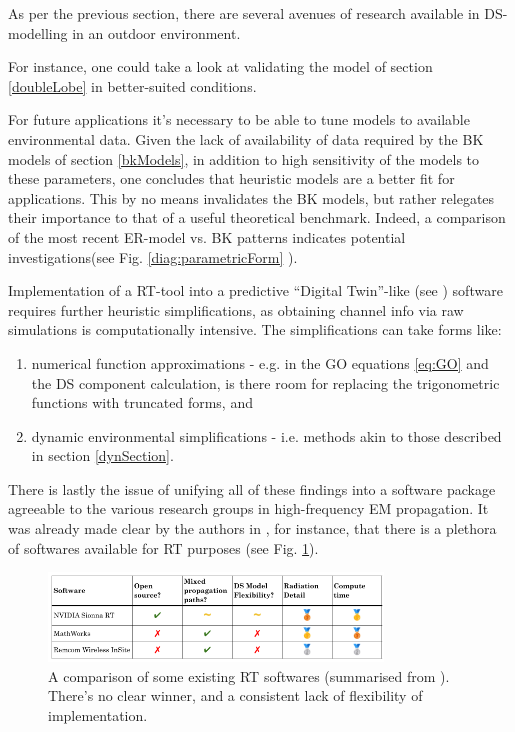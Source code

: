 \documentclass[lettersize,journal]{IEEEtran}
\begin{document}
As per the previous section, there are several avenues of research available in DS-modelling in an outdoor environment.

For instance, one could take a look at validating the model of section \ref{doubleLobe} in better-suited conditions.

For future applications it's necessary to be able to tune models to available environmental data. Given the lack of availability of data required by the BK models of section \ref{bkModels}, in addition to high sensitivity of the models to these parameters, one concludes that heuristic models are a better fit for applications. This by no means invalidates the BK models, but rather relegates their importance to that of a useful theoretical benchmark. Indeed, a comparison of the most recent ER-model vs. BK patterns indicates potential investigations(see Fig. \ref{diag:parametricForm} ).


Implementation of a RT-tool into a predictive ``Digital Twin''-like (see \cite{ref:RTComparison}) software requires further heuristic simplifications, as obtaining channel info via raw simulations is computationally intensive. The simplifications can take forms like:

\begin{enumerate}
	\item numerical function approximations - e.g. in the GO equations \eqref{eq:GO} and the DS component calculation, is there room for replacing the trigonometric functions with truncated forms, and
	\item dynamic environmental simplifications - i.e. methods akin to those described in section \ref{dynSection}.
\end{enumerate}

There is lastly the issue of unifying all of these findings into a software package agreeable to the various research groups in high-frequency EM propagation. It was already made clear by the authors in \cite{ref:RTComparison}, for instance, that there is a plethora of softwares available for RT purposes (see Fig. \ref{diag:RTSoftware}).

\begin{figure}[b]
\centering
\includegraphics[width=3.5in]{RTSoftware}
\captionsetup{singlelinecheck=off}
	\caption[]{A comparison of some existing RT softwares (summarised from \cite{ref:RTComparison}). There's no clear winner, and a consistent lack of flexibility of implementation.}
\label{diag:RTSoftware}
\end{figure}
\end{document}
